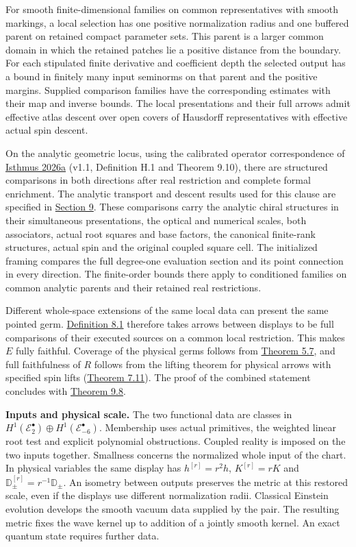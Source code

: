 \documentclass[
  english,
  11pt,
  reqno]{amsart}
\makeatletter
\newcommand{\paperleadspace}{%
  \par\if@nobreak\else
    \addpenalty{\@secpenalty}\addvspace{.5\baselineskip}%
  \fi}
\newcommand{\paperleadin}[1]{%
  \ifvmode\paperleadspace\fi
  \textbf{#1}}
\makeatother
\begin{document}
For smooth finite-dimensional families on common representatives with
smooth markings, a local selection has one positive normalization radius
and one buffered parent on retained compact parameter sets. This parent
is a larger common domain in which the retained patches lie a positive
distance from the boundary. For each stipulated finite derivative and
coefficient depth the selected output has a bound in finitely many input
seminorms on that parent and the positive margins. Supplied comparison
families have the corresponding estimates with their map and inverse
bounds. The local presentations and their full arrows admit effective
atlas descent over open covers of Hausdorff representatives with
effective actual spin descent.

On the analytic geometric locus, using the calibrated operator
correspondence of \hyperref[ref-IsthmusLocal2026]{Isthmus 2026a} (v1.1,
Definition H.1 and Theorem 9.10), there are structured comparisons in
both directions after real restriction and complete formal enrichment.
The analytic transport and descent results used for this clause are
specified in \hyperref[sec:analytic-wave-comparison]{Section 9}. These
comparisons carry the analytic chiral structures in their simultaneous
presentations, the optical and numerical scales, both associators,
actual root squares and base factors, the canonical finite-rank
structures, actual spin and the original coupled square cell. The
initialized framing compares the full degree-one evaluation section and
its point connection in every direction. The finite-order bounds there
apply to conditioned families on common analytic parents and their
retained real restrictions.

Different whole-space extensions of the same local data can present the
same pointed germ. \hyperref[def:local-display-groupoids]{Definition
8.1} therefore takes arrows between displays to be full comparisons of
their executed sources on a common local restriction. This makes \(E\)
fully faithful. Coverage of the physical germs follows from
\hyperref[thm:submission-vacuum-germ-coverage]{Theorem 5.7}, and full
faithfulness of \(R\) follows from the lifting theorem for physical
arrows with specified spin lifts
(\hyperref[thm:online-full-unmarked-source-hom]{Theorem 7.11}). The
proof of the combined statement concludes with
\hyperref[thm:combined-local-atlas]{Theorem 9.8}.

\paperleadin{Inputs and physical scale.} The two functional data are classes
in \(H^1(\mathscr E_2^\bullet)\oplus H^1(\mathscr E_{-6}^\bullet)\).
Membership uses actual primitives, the weighted linear root test and
explicit polynomial obstructions. Coupled reality is imposed on the two
inputs together. Smallness concerns the normalized whole input of the
chart. In physical variables the same display has \(h^{[r]}=r^2h\),
\(K^{[r]}=rK\) and \(\mathbb D_\pm^{[r]}=r^{-1}\mathbb D_\pm\). An
isometry between outputs preserves the metric at this restored scale,
even if the displays use different normalization radii. Classical
Einstein evolution develops the smooth vacuum data supplied by the pair.
The resulting metric fixes the wave kernel up to addition of a jointly
smooth kernel. An exact quantum state requires further data.
\end{document}

